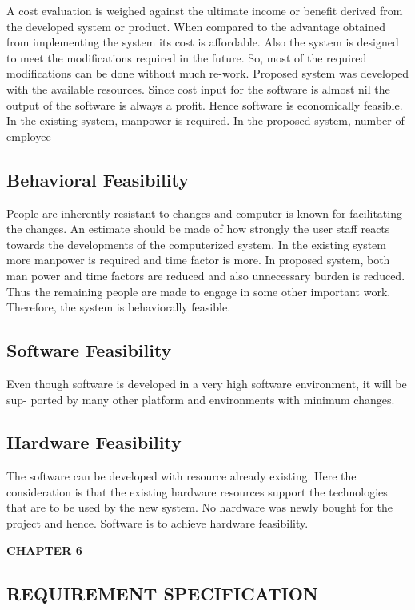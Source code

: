 \documentclass[12pt]{article}
\begin{document}
\begin{enumerate}
A cost evaluation is weighed against the ultimate income or benefit derived from
the developed system or product. When compared to the advantage obtained from
implementing the system its cost is affordable. Also the system is designed to meet the
modifications required in the future. So, most of the required modifications can be done
without much re-work. Proposed system was developed with the available resources.
Since cost input for the software is almost nil the output of the software is always a
profit. Hence software is economically feasible. In the existing system, manpower is
required. In the proposed system, number of employee



\subsection{Behavioral Feasibility }
People are inherently resistant to changes and computer is known for facilitating the
changes. An estimate should be made of how strongly the user staff reacts towards the
developments of the computerized system. In the existing system more manpower is
required and time factor is more. In proposed system, both man power and time factors
are reduced and also unnecessary burden is reduced. Thus the remaining people are
made to engage in some other important work. Therefore, the system is behaviorally
feasible.
\subsection{ Software Feasibility}

Even though software is developed in a very high software environment, it will be
sup- ported by many other platform and environments with minimum changes.

\subsection{ Hardware Feasibility}

The software can be developed with resource already existing. Here the consideration
is that the existing hardware resources support the technologies that are to be used by
the new system. No hardware was newly bought for the project and hence. Software
is to achieve hardware feasibility.
\newpage
\begin{flushleft}\textbf{CHAPTER 6} \end{flushleft}
\begin{flushleft}\section{REQUIREMENT SPECIFICATION} \end{flushleft}
\vspace*{10px}


\end{enumerate}
\end{document}

